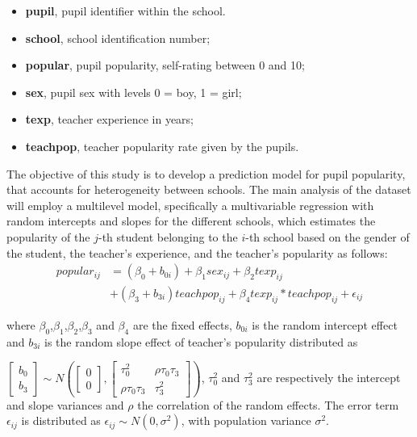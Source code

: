 \documentclass[
  article]{jss}
\providecommand{\tightlist}{%
  \setlength{\itemsep}{0pt}\setlength{\parskip}{0pt}}
\begin{document}
\begin{itemize}
\tightlist
\item
  \textbf{pupil}, pupil identifier within the school.\\
\item
  \textbf{school}, school identification number;
\item
  \textbf{popular}, pupil popularity, self-rating between 0 and 10;
\item
  \textbf{sex}, pupil sex with levels 0 = boy, 1 = girl;
\item
  \textbf{texp}, teacher experience in years;
\item
  \textbf{teachpop}, teacher popularity rate given by the pupils.
\end{itemize}

The objective of this study is to develop a prediction model for pupil
popularity, that accounts for heterogeneity between schools. The main
analysis of the dataset will employ a multilevel model, specifically a
multivariable regression with random intercepts and slopes for the
different schools, which estimates the popularity of the \(j\)-th
student belonging to the \(i\)-th school based on the gender of the
student, the teacher's experience, and the teacher's popularity as
follows: \begin{align*}
popular_{ij} &= (\beta_0 + b_{0i}) + \beta_1sex_{ij}+ \beta_2texp_{ij}\\
&+ (\beta_3+b_{3i})teachpop_{ij} + \beta_4 texp_{ij}*teachpop_{ij}+ \epsilon_{ij}
\end{align*}

where \(\beta_0\),\(\beta_1\),\(\beta_2\),\(\beta_3\) and \(\beta_4\)
are the fixed effects, \(b_{0i}\) is the random intercept effect and
\(b_{3i}\) is the random slope effect of teacher's popularity
distributed as

\(\begin{bmatrix}b_0\\b_3\end{bmatrix}\sim N\left(\begin{bmatrix}0\\0\end{bmatrix},\begin{bmatrix}\tau_0^2 & \rho\tau_0\tau_3\\\rho\tau_0\tau_3 & \tau_3^2\end{bmatrix}\right)\),
\(\tau_0^2\) and \(\tau_3^2\) are respectively the intercept and slope
variances and \(\rho\) the correlation of the random effects. The error
term \(\epsilon_{ij}\) is distributed as
\(\epsilon_{ij}\sim N(0,\sigma^2)\), with population variance
\(\sigma^2\).
\end{document}
